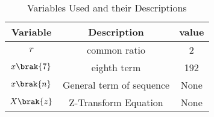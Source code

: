 \begin{table}[h!!]
\renewcommand\thetable{1}
    \centering
        \begin{tabular}{|c|c|c|}
	    \hline
	            Variable&             Description&value\\\hline
		                 $r$&            common ratio&2    \\\hline
				      $x\brak{7}$&              eighth term&192  \\\hline
				           $x\brak{n}$&General term of sequence&None \\\hline
					        $X\brak{z}$&    Z-Transform Equation&None \\\hline
						    \end{tabular}
						        \caption{Variables Used and their Descriptions}
							    \label{tab 11.9.3.2.1}
							    \end{table}
